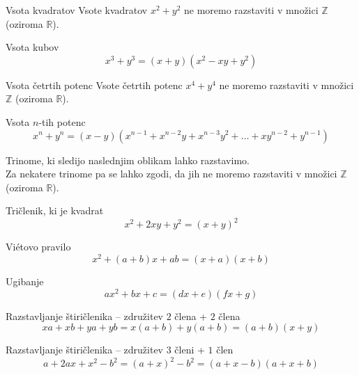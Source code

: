     \begin{frame}
        \begin{block}{Vsota kvadratov}
            Vsote kvadratov $x^2+y^2$ ne moremo razstaviti v množici $\mathbb{Z}$ (oziroma $\mathbb{R}$).
        \end{block}
        
        \begin{block}{Vsota kubov}
            $$ x^3+y^3=(x+y)(x^2-xy+y^2) $$
        \end{block} 

        \begin{block}{Vsota četrtih potenc}
            Vsote četrtih potenc $x^4+y^4$ ne moremo razstaviti v množici $\mathbb{Z}$ (oziroma $\mathbb{R}$).
        \end{block}

        \begin{block}{Vsota $n$-tih potenc}
            $$x^n+y^n=(x-y)(x^{n-1}+x^{n-2}y+x^{n-3}y^2+\ldots+xy^{n-2}+y^{n-1})$$
        \end{block}

    \end{frame}

    \begin{frame}

        \begin{block}{}
            Trinome, ki sledijo naslednjim oblikam lahko razstavimo. \\
            Za nekatere trinome pa se lahko zgodi, da jih ne moremo razstaviti v množici $\mathbb{Z}$ (oziroma $\mathbb{R}$).
        \end{block}
        \begin{block}{Tričlenik, ki je kvadrat}
            $$x^2+2xy+y^2=(x+y)^2$$
        \end{block}

        \begin{block}{Vi\'etovo pravilo}
            $$x^2+(a+b)x+ab=(x+a)(x+b)$$
        \end{block}

        \begin{block}{Ugibanje}
            $$ax^2+bx+c=(dx+e)(fx+g) $$
        \end{block}

    \end{frame}

    \begin{frame}

        \begin{block}{Razstavljanje štiričlenika -- združitev $2$ člena + $2$ člena}
            $$xa+xb+ya+yb=x(a+b)+y(a+b)=(a+b)(x+y)$$
        \end{block}

        \begin{block}{Razstavljanje štiričlenika -- združitev $3$ členi + $1$ člen}
            $$a+2ax+x^2-b^2=(a+x)^2-b^2=(a+x-b)(a+x+b)$$
        \end{block}

    \end{frame}



